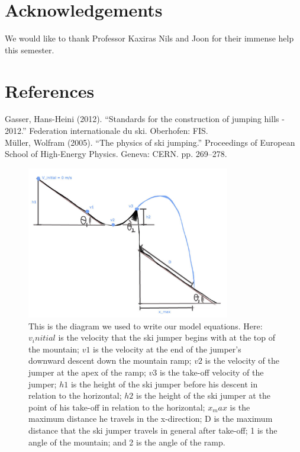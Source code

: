 \documentclass[]{IEEEphot}
\begin{document}
\section{Acknowledgements}
We would like to thank Professor Kaxiras Nils and Joon for their immense help this semester. 


\section{References}
Gasser, Hans-Heini (2012). “Standards for the construction of jumping hills - 2012.” Federation internationale du ski. Oberhofen: FIS.
\\
Müller, Wolfram (2005). “The physics of ski jumping.” Proceedings of European School of High-Energy Physics. Geneva: CERN. pp. 269–278.



\begin{figure}
\centering%
\includegraphics[width=21pc]{ramp}
\caption{This is the diagram we used to write our model equations. Here: $v_initial$ is the velocity that the ski jumper begins with at the top of the mountain; $v1$ is the velocity at the end of the jumper’s downward descent down the mountain ramp; $v2$ is the velocity of the jumper at the apex of the ramp; $v3$ is the take-off velocity of the jumper; $h1$ is the height of the ski jumper before his descent in relation to the horizontal; $h2$ is the height of the ski jumper at the point of his take-off in relation to the horizontal; $x_max$ is the maximum distance he travels in the x-direction; D is the maximum distance that the ski jumper travels in general after take-off; 1 is the angle of the mountain; and 2 is the angle of the ramp.}
\label{fig1}
\end{figure}
\end{document}
